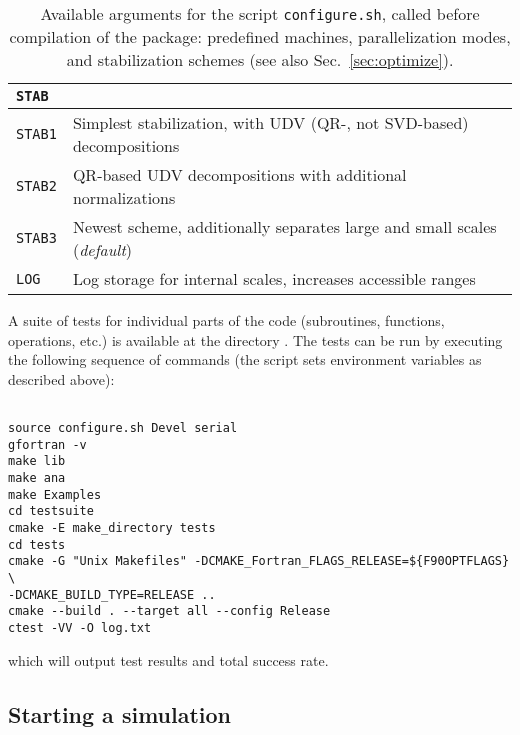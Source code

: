 \begin{table}[!ht]
\begin{center}
\begin{tabular}{@{} p{} p{} @{}}
			\textbf{\texttt{STAB}} &  \\\midrule
			\texttt{STAB1}  &  Simplest stabilization, with UDV (QR-, not SVD-based) decompositions\\
			\texttt{STAB2}  &  QR-based UDV decompositions with additional normalizations\\
			\texttt{STAB3}  &  Newest scheme, additionally separates large and small scales (\emph{default})\\
			\texttt{LOG}  &  Log storage for internal scales, increases accessible ranges\\\bottomrule
		\end{tabular}
		\caption{Available arguments for the script \texttt{configure.sh}, called before compilation of the package: predefined machines, parallelization modes, and stabilization schemes (see also Sec.~\ref{sec:optimize}).} \label{table:configureHPC}
	\end{center}
\end{table}

A suite of tests for individual parts of the code (subroutines, functions, operations, etc.) is available at the directory . The tests can be run by executing the following sequence of commands (the script  sets environment variables as described above):
\begin{lstlisting}[style=bash,morekeywords={make,cmake,ctest}]

source configure.sh Devel serial
gfortran -v
make lib
make ana
make Examples
cd testsuite
cmake -E make_directory tests
cd tests
cmake -G "Unix Makefiles" -DCMAKE_Fortran_FLAGS_RELEASE=${F90OPTFLAGS} \
-DCMAKE_BUILD_TYPE=RELEASE ..
cmake --build . --target all --config Release
ctest -VV -O log.txt
\end{lstlisting}
which will output test results and total success rate.

%
\subsection*{Starting a simulation}
%

